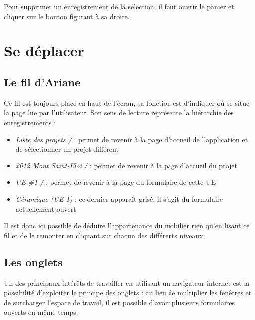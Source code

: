 \documentclass[letterpaper,10pt,french]{sphinxmanual}
\begin{document}
Pour supprimer un enregistrement de la sélection, il faut ouvrir le panier et cliquer sur le bouton  figurant à sa droite.


\section{Se déplacer}
\label{manuel/interface:se-deplacer}

\subsection{Le fil d'Ariane}
\label{manuel/interface:le-fil-d-ariane}\begin{figure}[htbp]
\centering

\end{figure}

Ce fil est toujours placé en haut de l'écran, sa fonction est d'indiquer où se situe la page lue par l'utilisateur. Son sens de lecture représente la hiérarchie des enregistrements :
\begin{itemize}
\item {} 
\emph{Liste des projets /} : permet de revenir à la page d'accueil de l'application et de sélectionner un projet différent

\item {} 
\emph{2012 Mont Saint-Eloi /} : permet de revenir à la page d'accueil du projet

\item {} 
\emph{UE \#1 /} : permet de revenir à la page du formulaire de cette UE

\item {} 
\emph{Céramique (UE 1)} : ce dernier apparaît grisé, il s'agit du formulaire actuellement ouvert

\end{itemize}

Il est donc ici possible de déduire l'appartenance du mobilier rien qu'en lisant ce fil et de le remonter en cliquant sur chacun des différents niveaux.


\subsection{Les onglets}
\label{manuel/interface:les-onglets}
Un des principaux intérêts de travailler en utilisant un navigateur internet est la possibilité d'exploiter le principe des onglets : au lieu de multiplier les fenêtres et de surcharger l'espace de travail, il est possible d'avoir plusieurs formulaires ouverts en même temps.
\end{document}
